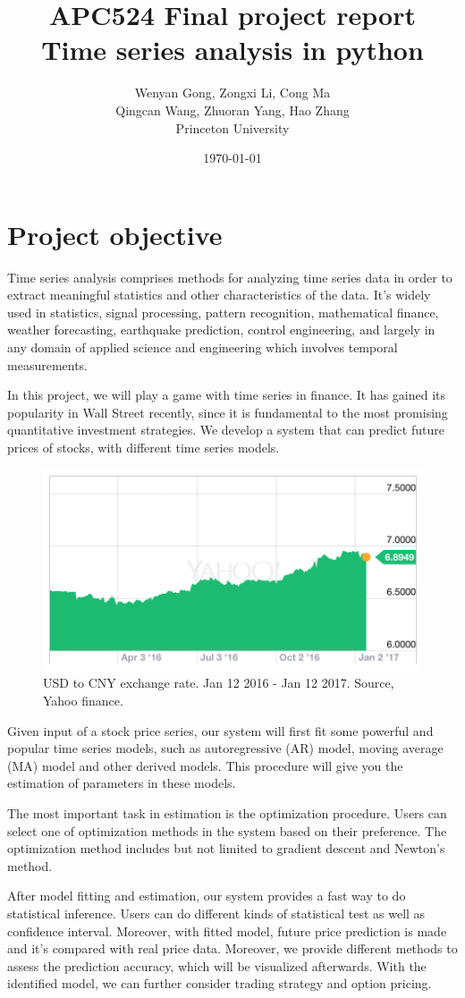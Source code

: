 \documentclass[12pt,a4paper]{article}
\title{APC524 Final project report
\\Time series analysis in python}
\author{Wenyan Gong, Zongxi Li, Cong Ma
\\Qingcan Wang, Zhuoran Yang, Hao Zhang
\\Princeton University}
\date{\today}
\begin{document}
\maketitle

\section{Project objective}
Time series analysis comprises methods for analyzing time series data in order to extract meaningful statistics and other characteristics of the data. It’s widely used in statistics, signal processing, pattern recognition, mathematical finance, weather forecasting, earthquake prediction, control engineering, and largely in any domain of applied science and engineering which involves temporal measurements. 

In this project, we will play a game with time series in finance. It has gained its popularity in Wall Street recently, since it is fundamental to the most promising quantitative investment strategies. We develop a system that can predict future prices of stocks, with different time series models. 

\begin{figure}[H]
        \centering
     \includegraphics[width=.5\linewidth]{./Figure/USD-CNY.png}
\caption{USD to CNY exchange rate. Jan 12 2016 - Jan 12 2017. Source, Yahoo finance.}
\end{figure}

Given input of a stock price series, our system will first fit some powerful and popular time series models, such as autoregressive (AR) model, moving average (MA) model and other derived models. This procedure will give you the estimation of parameters in these models. 

The most important task in estimation is the optimization procedure. Users can select one of optimization methods in the system based on their preference. The optimization method includes but not limited to gradient descent and Newton’s method.

After model fitting and estimation, our system provides a fast way to do statistical inference. Users can do different kinds of statistical test as well as confidence interval. Moreover, with fitted model, future price prediction is made and it’s compared with real price data. Moreover, we provide different methods to assess the prediction accuracy, which will be visualized afterwards. With the identified model, we can further consider trading strategy and option pricing.
\end{document}
